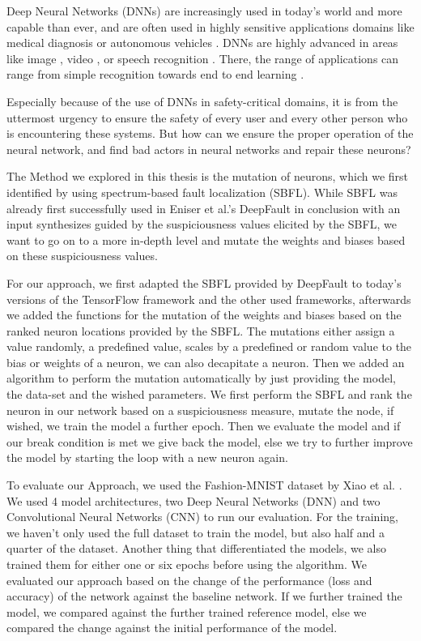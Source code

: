 Deep Neural Networks (DNNs) \cite{lecun_deep_2015} are increasingly used in today's world and more capable than ever, and are often used in highly sensitive applications domains like medical diagnosis \cite{litjens_survey_2017} or autonomous vehicles \cite{bojarski_end_2016}.
DNNs are highly advanced in areas like image \cite{krizhevsky_imagenet_2012, ciresan_multi-column_2012}, video \cite{jiang_exploiting_2018}, or speech recognition \cite{hinton_deep_2012}.
There, the range of applications can range from simple recognition towards end to end learning \cite{bojarski_end_2016}.

Especially because of the use of DNNs in safety-critical domains, it is from the uttermost urgency to ensure the safety of every user and every other person who is encountering these systems.
But how can we ensure the proper operation of the neural network, and find bad actors in neural networks and repair these neurons?

The Method we explored in this thesis is the mutation of neurons, which we first identified by using spectrum-based fault localization (SBFL).
While SBFL was already first successfully used in Eniser et al.'s DeepFault \cite{eniser_deepfault_2019} in conclusion with an input synthesizes guided by the suspiciousness values elicited by the SBFL, we want to go on to a more in-depth level and mutate the weights and biases based on these suspiciousness values.

For our approach, we first adapted the SBFL provided by DeepFault to today's versions of the TensorFlow framework and the other used frameworks, afterwards we added the functions for the mutation of the weights and biases based on the ranked neuron locations provided by the SBFL.
The mutations either assign a value randomly, a predefined value, scales by a predefined or random value to the bias or weights of a neuron, we can also decapitate a neuron.
Then we added an algorithm to perform the mutation automatically by just providing the model, the data-set and the wished parameters.
We first perform the SBFL and rank the neuron in our network based on a suspiciousness measure, mutate the node, if wished, we train the model a further epoch.
Then we evaluate the model and if our break condition is met we give back the model, else we try to further improve the model by starting the loop with a new neuron again.

To evaluate our Approach, we used the Fashion-MNIST dataset by Xiao et al. \cite{xiao_fashion-mnist_2017}.
We used 4 model architectures, two Deep Neural Networks (DNN) and two Convolutional Neural Networks (CNN) to run our evaluation.
For the training, we haven't only used the full dataset to train the model, but also half and a quarter of the dataset.
Another thing that differentiated the models, we also trained them for either one or six epochs before using the algorithm.
We evaluated our approach based on the change of the performance (loss and accuracy) of the network against the baseline network.
If we further trained the model, we compared against the further trained reference model, else we compared the change against the initial performance of the model.

